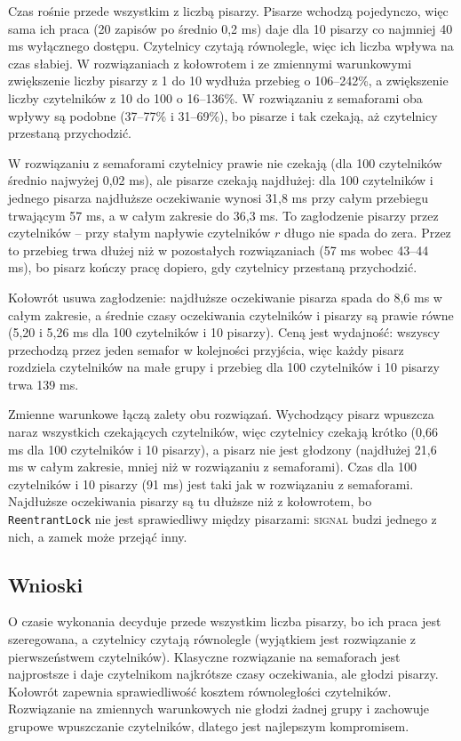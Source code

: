 \documentclass[11pt,a4paper]{article}
\begin{document}
Czas rośnie przede wszystkim z liczbą pisarzy. Pisarze wchodzą pojedynczo, więc sama ich praca
(20 zapisów po średnio 0,2 ms) daje dla 10 pisarzy co najmniej 40 ms wyłącznego dostępu.
Czytelnicy czytają równolegle, więc ich liczba wpływa na czas słabiej. W rozwiązaniach z kołowrotem
i ze zmiennymi warunkowymi zwiększenie liczby pisarzy z 1 do 10 wydłuża przebieg o 106--242\%,
a zwiększenie liczby czytelników z 10 do 100 o 16--136\%. W rozwiązaniu z semaforami oba wpływy są
podobne (37--77\% i 31--69\%), bo pisarze i tak czekają, aż czytelnicy przestaną przychodzić.

W rozwiązaniu z semaforami czytelnicy prawie nie czekają (dla 100 czytelników średnio najwyżej 0,02 ms),
ale pisarze czekają najdłużej: dla 100 czytelników i jednego pisarza najdłuższe oczekiwanie wynosi
31,8 ms przy całym przebiegu trwającym 57 ms, a w całym zakresie do 36,3 ms. To zagłodzenie
pisarzy przez czytelników -- przy stałym napływie czytelników $r$ długo nie spada do zera.
Przez to przebieg trwa dłużej niż w pozostałych rozwiązaniach (57 ms wobec 43--44 ms), bo pisarz
kończy pracę dopiero, gdy czytelnicy przestaną przychodzić.

Kołowrót usuwa zagłodzenie: najdłuższe oczekiwanie pisarza spada do 8,6 ms w całym zakresie, a średnie
czasy oczekiwania czytelników i pisarzy są prawie równe (5,20 i 5,26 ms dla 100 czytelników i 10 pisarzy).
Ceną jest wydajność: wszyscy przechodzą przez jeden semafor w kolejności przyjścia, więc każdy pisarz
rozdziela czytelników na małe grupy i przebieg dla 100 czytelników i 10 pisarzy trwa 139 ms.

Zmienne warunkowe łączą zalety obu rozwiązań. Wychodzący pisarz wpuszcza naraz wszystkich czekających
czytelników, więc czytelnicy czekają krótko (0,66 ms dla 100 czytelników i 10 pisarzy), a pisarz nie jest
głodzony (najdłużej 21,6 ms w całym zakresie, mniej niż w rozwiązaniu z semaforami). Czas
dla 100 czytelników i 10 pisarzy (91 ms) jest taki jak w rozwiązaniu z semaforami. Najdłuższe oczekiwania
pisarzy są tu dłuższe niż z kołowrotem, bo \texttt{ReentrantLock} nie jest sprawiedliwy między pisarzami:
\textsc{signal} budzi jednego z nich, a zamek może przejąć inny.

\subsection{Wnioski}
O czasie wykonania decyduje przede wszystkim liczba pisarzy, bo ich praca jest szeregowana,
a czytelnicy czytają równolegle (wyjątkiem jest rozwiązanie z pierwszeństwem czytelników). Klasyczne rozwiązanie na semaforach jest najprostsze
i daje czytelnikom najkrótsze czasy oczekiwania, ale głodzi pisarzy. Kołowrót zapewnia sprawiedliwość
kosztem równoległości czytelników. Rozwiązanie na zmiennych warunkowych nie głodzi żadnej grupy
i zachowuje grupowe wpuszczanie czytelników, dlatego jest najlepszym kompromisem.
\end{document}
